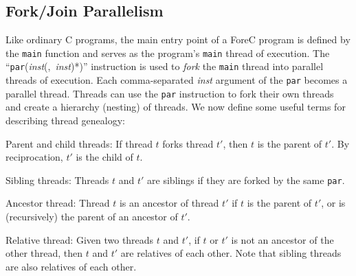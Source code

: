 
\subsection{Fork/Join Parallelism}
Like ordinary C programs, the main entry point of a ForeC program
is defined by the \verb$main$ function and serves as the program's
\verb$main$ thread of execution. The ``\verb$par$(\emph{inst}(,~\emph{inst})*)''
instruction is used to \emph{fork} the \verb$main$ thread into parallel 
threads of execution. Each comma-separated \emph{inst} argument of the
\verb$par$ becomes a parallel thread. Threads can use the \verb$par$ 
instruction to fork their own threads and create a hierarchy (nesting) 
of threads. We now define some useful terms for describing thread genealogy:

\begin{definition}
	\label{def:forec_genealogy_parent_child}
	Parent and child threads: If thread $t$ forks thread $t'$, then $t$ is the 
	parent of $t'$. By reciprocation, $t'$ is the child of $t$.
\end{definition}

\begin{definition}
	\label{def:forec_genealogy_sibling}
	Sibling threads: Threads $t$ and $t'$ are siblings if they are forked by the same 
	\verb$par$.
\end{definition}

\begin{definition}
	\label{def:forec_genealogy_ancestor}
	Ancestor thread: Thread $t$ is an ancestor of thread $t'$ if $t$ is the 
	parent of $t'$, or is (recursively) the parent of an ancestor
	of $t'$.
\end{definition}

\begin{definition}
	\label{def:forec_genealogy_relative}
	Relative thread: Given two threads $t$ and $t'$, if $t$ or $t'$ is not an ancestor of 
	the other thread, then $t$ and $t'$ are relatives of each other. Note that sibling
	threads are also relatives of each other.
\end{definition}

